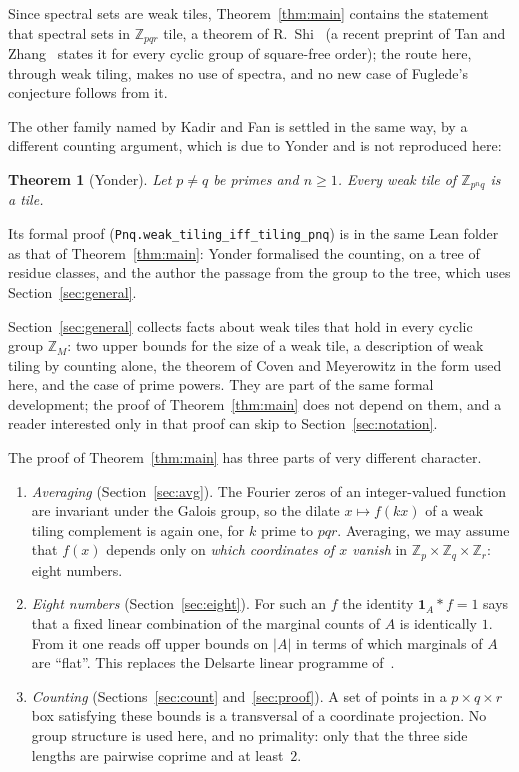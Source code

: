 \documentclass[11pt,a4paper]{amsart}
\newtheorem{theorem}{Theorem}
\theoremstyle{definition}
\theoremstyle{remark}
\newcommand{\Z}{\mathbb{Z}}
\newcommand{\one}{\mathbf{1}}
\newcommand{\lean}[1]{\texttt{#1}}
\begin{document}
Since spectral sets are weak tiles, Theorem~\ref{thm:main} contains the statement that spectral sets in
$\Z_{pqr}$ tile, a theorem of R.~Shi~\cite{Shi} (a recent preprint of Tan and Zhang~\cite{TZ2} states it for
every cyclic group of square-free order); the route here, through weak tiling, makes no use of spectra, and no
new case of Fuglede's conjecture follows from it.

The other family named by Kadir and Fan is settled in the same way, by a different counting argument, which is
due to Yonder and is not reproduced here:

\begin{theorem}[Yonder]\label{thm:pnq}
Let $p\ne q$ be primes and $n\ge 1$. Every weak tile of $\Z_{p^nq}$ is a tile.
\end{theorem}

\noindent Its formal proof (\lean{Pnq.weak\_tiling\_iff\_tiling\_pnq}) is in the same Lean folder as that of
Theorem~\ref{thm:main}: Yonder formalised the counting, on a tree of residue classes, and the author the passage
from the group to the tree, which uses Section~\ref{sec:general}.

Section~\ref{sec:general} collects facts about weak tiles that hold in every cyclic group $\Z_M$: two upper
bounds for the size of a weak tile, a description of weak tiling by counting alone, the theorem of Coven and
Meyerowitz in the form used here, and the case of prime powers. They are part of the same formal development; the
proof of Theorem~\ref{thm:main} does not depend on them, and a reader interested only in that proof can skip to
Section~\ref{sec:notation}.

The proof of Theorem~\ref{thm:main} has three parts of very different character.
\begin{enumerate}
\item \emph{Averaging} (Section~\ref{sec:avg}). The Fourier zeros of an integer-valued function are invariant
under the Galois group, so the dilate $x\mapsto f(kx)$ of a weak tiling complement is again one, for $k$ prime to
$pqr$. Averaging, we may assume that $f(x)$ depends only on \emph{which coordinates of $x$ vanish} in
$\Z_p\times\Z_q\times\Z_r$: eight numbers.
\item \emph{Eight numbers} (Section~\ref{sec:eight}). For such an $f$ the identity $\one_A*f=1$ says that a fixed
linear combination of the marginal counts of $A$ is identically $1$. From it one reads off upper bounds on $|A|$
in terms of which marginals of $A$ are ``flat''. This replaces the Delsarte linear programme of~\cite{KLMS,KF}.
\item \emph{Counting} (Sections~\ref{sec:count} and~\ref{sec:proof}). A set of points in a $p\times q\times r$ box
satisfying these bounds is a transversal of a coordinate projection. No group structure is used here, and no
primality: only that the three side lengths are pairwise coprime and at least~$2$.
\end{enumerate}
\end{document}
